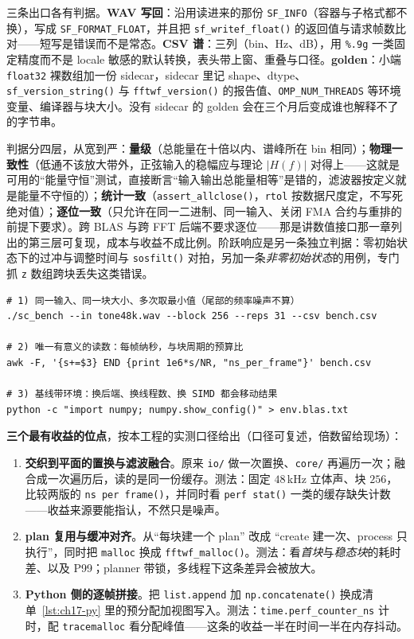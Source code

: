 \documentclass[12pt,a4paper,fontset=fandol]{ctexbook}
\newcommand{\Fn}[1]{\texttt{#1()}}
\newcommand{\Tp}[1]{\texttt{#1}}
\newcommand{\Lang}[1]{\textsf{\bfseries #1}}
\newcommand{\PY}{\Lang{Python}}
\begin{document}
三条出口各有判据。\textbf{WAV 写回}：沿用读进来的那份 \Tp{SF\_INFO}（容器与子格式都不换），写成 \Tp{SF\_FORMAT\_FLOAT}，并且把 \Fn{sf\_writef\_float} 的返回值与请求帧数比对——短写是错误而不是常态。\textbf{CSV 谱}：三列（bin、Hz、dB），用 \Tp{\%.9g} 一类固定精度而不是 locale 敏感的默认转换，表头带上窗、重叠与口径。\textbf{golden}：小端 \Tp{float32} 裸数组加一份 sidecar，sidecar 里记 shape、dtype、\Fn{sf\_version\_string} 与 \Fn{fftwf\_version} 的报告值、\Tp{OMP\_NUM\_THREADS} 等环境变量、编译器与块大小。没有 sidecar 的 golden 会在三个月后变成谁也解释不了的字节串。

判据分四层，从宽到严：\textbf{量级}（总能量在十倍以内、谱峰所在 bin 相同）；\textbf{物理一致性}（低通不该放大带外，正弦输入的稳幅应与理论 $|H(f)|$ 对得上——这就是可用的``能量守恒''测试，直接断言``输入输出总能量相等''是错的，滤波器按定义就是能量不守恒的）；\textbf{统计一致}（\Fn{assert\_allclose}，\Tp{rtol} 按数据尺度定，不写死绝对值）；\textbf{逐位一致}（只允许在同一二进制、同一输入、关闭 FMA 合约与重排的前提下要求）。跨 BLAS 与跨 FFT 后端不要求逐位——那是讲数值接口那一章列出的第三层可复现，成本与收益不成比例。阶跃响应是另一条独立判据：零初始状态下的过冲与调整时间与 \Fn{sosfilt} 对拍，另加一条\emph{非零初始状态}的用例，专门抓 \Tp{z} 数组跨块丢失这类错误。

\begin{lstlisting}[style=shellstyle,caption={三个位点的测法：读数换成 ns 每帧，环境写进 sidecar},label={lst:ch17-meas}]
# 1) 同一输入、同一块大小、多次取最小值（尾部的频率噪声不算）
./sc_bench --in tone48k.wav --block 256 --reps 31 --csv bench.csv

# 2) 唯一有意义的读数：每帧纳秒，与块周期的预算比
awk -F, '{s+=$3} END {print 1e6*s/NR, "ns_per_frame"}' bench.csv

# 3) 基线带环境：换后端、换线程数、换 SIMD 都会移动结果
python -c "import numpy; numpy.show_config()" > env.blas.txt
\end{lstlisting}

\textbf{三个最有收益的位点}，按本工程的实测口径给出（口径可复述，倍数留给现场）：

\begin{enumerate}
\item \textbf{交织到平面的置换与滤波融合}。原来 \Tp{io/} 做一次置换、\Tp{core/} 再遍历一次；融合成一次遍历后，读的是同一份缓存。测法：固定 $48$\,kHz 立体声、块 $256$，比较两版的 \Fn{ns per frame}，并同时看 \Fn{perf stat} 一类的缓存缺失计数——收益来源要能指认，不然只是噪声。
\item \textbf{plan 复用与缓冲对齐}。从``每块建一个 plan'' 改成 ``create 建一次、process 只执行''，同时把 \Tp{malloc} 换成 \Fn{fftwf\_malloc}。测法：看\emph{首块}与\emph{稳态块}的耗时差、以及 P99；planner 带锁，多线程下这条差异会被放大。
\item \textbf{\PY{} 侧的逐帧拼接}。把 \Tp{list.append} 加 \Fn{np.concatenate} 换成清单~\ref{lst:ch17-py} 里的预分配加视图写入。测法：\Tp{time.perf\_counter\_ns} 计时，配 \Tp{tracemalloc} 看分配峰值——这条的收益一半在时间一半在内存抖动。
\end{enumerate}
\end{document}
